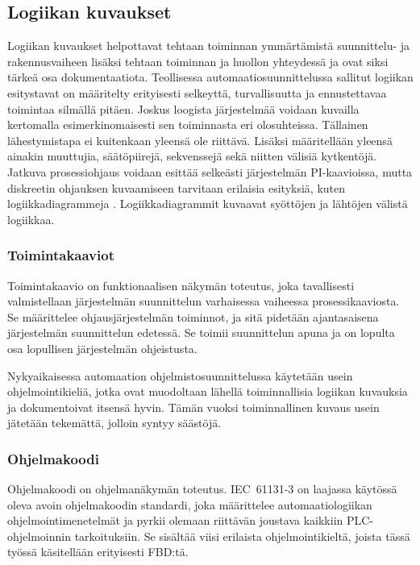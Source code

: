 \documentclass[finnish,12pt]{article}
\begin{document}
	\subsection{Logiikan kuvaukset}

Logiikan kuvaukset helpottavat tehtaan toiminnan ymmärtämistä suunnittelu- ja rakennusvaiheen lisäksi tehtaan toiminnan ja huollon yhteydessä ja ovat siksi tärkeä osa dokumentaatiota.
Teollisessa automaatiosuunnittelussa sallitut logiikan esitystavat on määritelty erityisesti selkeyttä, turvallisuutta ja ennustettavaa toimintaa silmällä pitäen.
Joskus loogista järjestelmää voidaan kuvailla kertomalla esimerkinomaisesti sen toiminnasta eri olosuhteissa.
Tällainen lähestymistapa ei kuitenkaan yleensä ole riittävä.
Lisäksi määritellään yleensä ainakin muuttujia, säätöpiirejä, sekvenssejä sekä niitten välisiä kytkentöjä.\cite{RefWorks:41}
Jatkuva prosessiohjaus voidaan esittää selkeästi järjestelmän PI-kaavioissa, mutta diskreetin ohjauksen kuvaamiseen tarvitaan erilaisia esityksiä, kuten logiikkadiagrammeja \cite{RefWorks:54}. 
Logiikkadiagrammit kuvaavat syöttöjen ja lähtöjen välistä logiikkaa.

		\subsubsection{Toimintakaaviot}

Toimintakaavio on funktionaalisen näkymän toteutus, joka tavallisesti valmistellaan järjestelmän suunnittelun varhaisessa vaiheessa prosessikaaviosta.
Se määrittelee ohjausjärjestelmän toiminnot, ja sitä pidetään ajantasaisena järjestelmän suunnittelun edetessä.
Se toimii suunnittelun apuna ja on lopulta osa lopullisen järjestelmän ohjeistusta.

Nykyaikaisessa automaation ohjelmistosuunnittelussa käytetään usein ohjelmointikieliä, jotka ovat muodoltaan lähellä toiminnallisia logiikan kuvauksia ja dokumentoivat itsensä hyvin.
Tämän vuoksi toiminnallinen kuvaus usein jätetään tekemättä, jolloin syntyy säästöjä. \cite{RefWorks:41}

		\subsubsection{Ohjelmakoodi}

Ohjelmakoodi on ohjelmanäkymän toteutus.
IEC~61131-3 on laajassa käytössä oleva avoin ohjelmakoodin standardi, joka määrittelee automaatiologiikan ohjelmointimenetelmät ja pyrkii olemaan riittävän joustava kaikkiin PLC-ohjelmoinnin tarkoituksiin.
Se sisältää viisi erilaista ohjelmointikieltä, joista tässä työssä käsitellään erityisesti FBD:tä. \cite{RefWorks:62}
\end{document}
